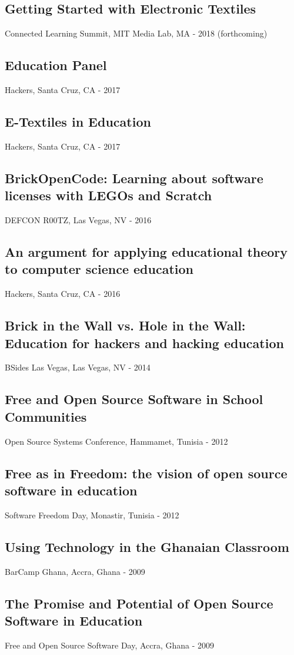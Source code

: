 \documentclass[../main.tex]{subfiles}
\begin{document}
\subsection*{Getting Started with Electronic Textiles}
     Connected Learning Summit, MIT Media Lab, MA - 2018 (forthcoming)

\subsection*{Education Panel}
     Hackers, Santa Cruz, CA - 2017

\subsection*{E-Textiles in Education}
     Hackers, Santa Cruz, CA - 2017


\subsection*{BrickOpenCode: Learning about software licenses with LEGOs and Scratch}
 DEFCON R00TZ, Las Vegas, NV - 2016


\subsection*{An argument for applying educational theory to computer science education}
     Hackers, Santa Cruz, CA - 2016


\subsection*{Brick in the Wall vs. Hole in the Wall: Education for hackers and hacking education}
 BSides Las Vegas, Las Vegas, NV - 2014


\subsection*{Free and Open Source Software in School Communities}
 Open Source Systems Conference, Hammamet, Tunisia - 2012


\subsection*{Free as in Freedom: the vision of open source software in education}
 Software Freedom Day, Monastir, Tunisia - 2012


\subsection*{Using Technology in the Ghanaian Classroom}
 BarCamp Ghana, Accra, Ghana - 2009


\subsection*{The Promise and Potential of Open Source Software in Education}
 Free and Open Source Software Day, Accra, Ghana - 2009
\end{document}
